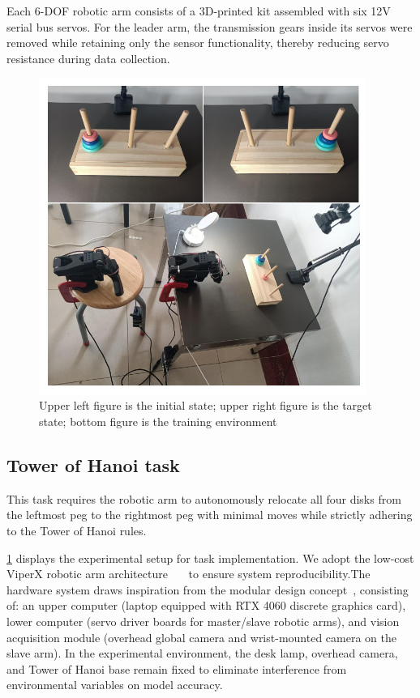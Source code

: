 \documentclass[runningheads]{llncs}
\begin{document}
Each 6-DOF robotic arm consists of a 3D-printed kit assembled with six 12V serial bus servos. For the leader arm, the transmission gears inside its servos were removed while retaining only the sensor functionality, thereby reducing servo resistance during data collection.


\begin{figure}
\centering
  \includegraphics[width=0.95\textwidth]{fig4.pdf}
  \caption{Upper left figure is the initial state; upper right figure is the target state; bottom figure is the training environment} \label{fig2}
  \end{figure}

\subsection{Tower of Hanoi task}

This task requires the robotic arm to autonomously relocate all four disks from the leftmost peg to the rightmost peg with minimal moves while strictly adhering to the Tower of Hanoi rules.

\cref{fig2} displays the experimental setup for task implementation. We adopt the low-cost ViperX robotic arm architecture~\cite{ref1}~\cite{ref2}~\cite{ref3} to ensure system reproducibility.The hardware system draws inspiration from the modular design concept~\cite{ref4}, consisting of: an upper computer (laptop equipped with RTX 4060 discrete graphics card), lower computer (servo driver boards for master/slave robotic arms), and vision acquisition module (overhead global camera and wrist-mounted camera on the slave arm). In the experimental environment, the desk lamp, overhead camera, and Tower of Hanoi base remain fixed to eliminate interference from environmental variables on model accuracy.
\end{document}
